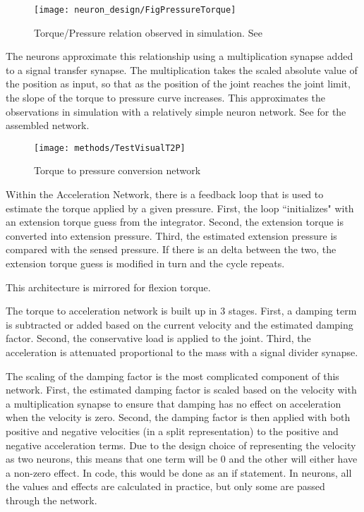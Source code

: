 \begin{figure}
\centering
\texttt{[image: neuron\_design/FigPressureTorque]}
\caption{Torque/Pressure relation observed in simulation. See }
\label{fig:PressureTorque}
\end{figure}

The neurons approximate this relationship using a multiplication synapse added
to a signal transfer synapse. The multiplication takes the scaled absolute 
value of the position as input, so that as the position of the joint reaches
the joint limit, the slope of the torque to pressure curve increases. This
approximates the observations in simulation with a relatively simple neuron
network. See  for the assembled network.

\begin{figure}
\centering
\texttt{[image: methods/TestVisualT2P]}
\caption{Torque to pressure conversion network}
\label{fig:T2PNetwork}
\end{figure}


Within the Acceleration Network, there is a feedback loop that is used to 
estimate the torque applied by a given pressure. First, the loop ``initializes"
with an extension torque guess from the integrator. Second, the extension
torque is converted into extension pressure. Third, the estimated extension
pressure is compared with the sensed pressure. If there is an delta between the
two, the extension torque guess is modified in turn and the cycle repeats.

This architecture is mirrored for flexion torque.


The torque to acceleration network is built up in 3 stages. First, a damping 
term is subtracted or added based on the current velocity and the estimated
damping factor. Second, the conservative load is applied to the joint. Third,
the acceleration is attenuated proportional to the mass with a signal divider
synapse.

The scaling of the damping factor is the most complicated component of this
network. First, the estimated damping factor is scaled based on the velocity 
with a multiplication synapse to ensure that damping has no effect on acceleration
when the velocity is zero. Second, the damping factor is then applied with both positive and
negative velocities (in a split representation) to the positive and negative
acceleration terms. Due to the design choice of representing the velocity as two
neurons, this means that one term will be 0 and the other will either have a 
non-zero effect. In code, this would be done as an if statement. In neurons,
all the values and effects are calculated in practice, but only some are passed
through the network.

